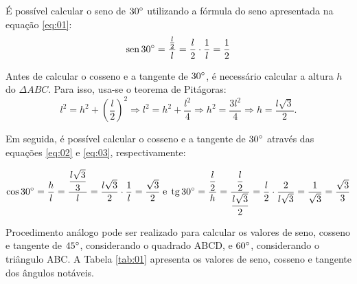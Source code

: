 É possível calcular o seno de $30 \degree$ utilizando a fórmula do seno apresentada na equação \ref{eq:01}:
\[
\operatorname{sen} 30 \degree = \dfrac{\frac{l}{2}}{l} = \dfrac{l}{2} \cdot \dfrac{1}{l} = \dfrac{1}{2}
\]

Antes de calcular o cosseno e a tangente de $30 \degree$, é necessário  calcular a altura $h$ do $\Delta ABC$. Para isso, usa-se o teorema de Pitágoras:
\[
l^2 = h^2 + \left(\dfrac{l}{2}\right)^2 \Rightarrow l^2 = h^2 + \dfrac{l^2}{4} \Rightarrow h^2 = \dfrac{3l^2}{4} \Rightarrow h = \dfrac{l\sqrt{3}}{2}.
\]

Em seguida, é possível calcular o cosseno e a tangente de $30 \degree$ através das equações \ref{eq:02} e \ref{eq:03}, respectivamente:

\[
\cos 30 \degree = \dfrac{h}{l} = \dfrac{\dfrac{l\sqrt{3}}{3}}{l} =  \dfrac{l\sqrt{3}}{2} \cdot \dfrac{1}{l} = \dfrac{\sqrt{3}}{2} \; \text{e} \; \operatorname{tg} 30 \degree = \dfrac{\dfrac{l}{2}}{h} =  \dfrac{\dfrac{l}{2}}{\dfrac{l\sqrt{3}}{2}} = \dfrac{l}{2} \cdot \dfrac{2}{l\sqrt{3}} = \dfrac{1}{\sqrt{3}} = \dfrac{\sqrt{3}}{3}
\]

Procedimento análogo pode ser realizado para calcular os valores de seno, cosseno e tangente de $45 \degree$, considerando o quadrado ABCD, e $60 \degree$, considerando o triângulo ABC. A Tabela \ref{tab:01} apresenta os valores de seno, cosseno e tangente dos ângulos notáveis.

